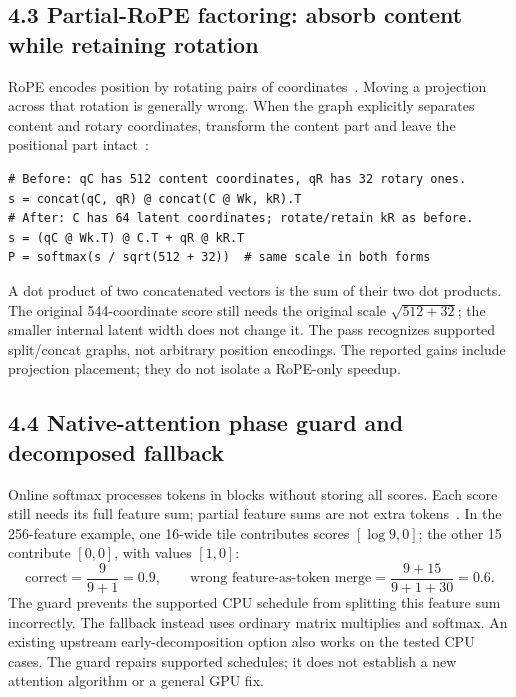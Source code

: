 \documentclass[10pt,a4paper]{article}
\begin{document}
\subsection*{4.3 Partial-RoPE factoring: absorb content while retaining rotation}
RoPE encodes position by rotating pairs of coordinates~\cite{rope}. Moving a projection across that rotation is generally wrong. When the graph explicitly separates content and rotary coordinates, transform the content part and leave the positional part intact~\cite{deepseek}:
\begin{lstlisting}
# Before: qC has 512 content coordinates, qR has 32 rotary ones.
s = concat(qC, qR) @ concat(C @ Wk, kR).T
# After: C has 64 latent coordinates; rotate/retain kR as before.
s = (qC @ Wk.T) @ C.T + qR @ kR.T
P = softmax(s / sqrt(512 + 32))  # same scale in both forms
\end{lstlisting}
A dot product of two concatenated vectors is the sum of their two dot products. The original 544-coordinate score still needs the original scale $\sqrt{512+32}$; the smaller internal latent width does not change it. The pass recognizes supported split/concat graphs, not arbitrary position encodings. The reported gains include projection placement; they do not isolate a RoPE-only speedup.

\subsection*{4.4 Native-attention phase guard and decomposed fallback}
Online softmax processes tokens in blocks without storing all scores. Each score still needs its full feature sum; partial feature sums are not extra tokens~\cite{online,flash}. In the 256-feature example, one 16-wide tile contributes scores $[\log9,0]$; the other 15 contribute $[0,0]$, with values $[1,0]$:
\[
\text{correct}=\frac9{9+1}=0.9,\qquad
\text{wrong feature-as-token merge}=\frac{9+15}{9+1+30}=0.6.
\]
The guard prevents the supported CPU schedule from splitting this feature sum incorrectly. The fallback instead uses ordinary matrix multiplies and softmax. An existing upstream early-decomposition option also works on the tested CPU cases. The guard repairs supported schedules; it does not establish a new attention algorithm or a general GPU fix.
\end{document}
